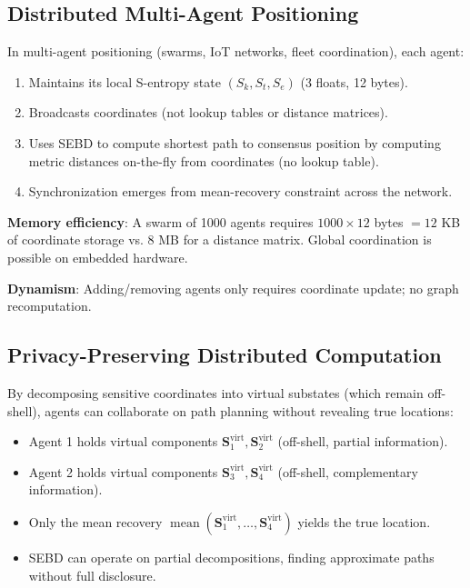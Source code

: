 \documentclass[twocolumn,11pt,a4paper]{article}
\newcommand{\Sk}{S_k}
\newcommand{\St}{S_t}
\newcommand{\Se}{S_e}
\newcommand{\Stuple}{\mathbf{S}}
\DeclareMathOperator{\mean}{mean}
\begin{document}
\subsection{Distributed Multi-Agent Positioning}

In multi-agent positioning (swarms, IoT networks, fleet coordination), each agent:
\begin{enumerate}[nosep]
  \item Maintains its local S-entropy state $(\Sk, \St, \Se)$ (3 floats, 12 bytes).
  \item Broadcasts coordinates (not lookup tables or distance matrices).
  \item Uses SEBD to compute shortest path to consensus position by computing metric distances on-the-fly from coordinates (no lookup table).
  \item Synchronization emerges from mean-recovery constraint across the network.
\end{enumerate}

\textbf{Memory efficiency}: A swarm of 1000 agents requires $1000 \times 12$ bytes $= 12$ KB of coordinate storage vs. 8 MB for a distance matrix. Global coordination is possible on embedded hardware.

\textbf{Dynamism}: Adding/removing agents only requires coordinate update; no graph recomputation.

\subsection{Privacy-Preserving Distributed Computation}

By decomposing sensitive coordinates into virtual substates (which remain off-shell), agents can collaborate on path planning without revealing true locations:
\begin{itemize}[nosep,leftmargin=1em]
  \item Agent 1 holds virtual components $\Stuple_1^{\text{virt}}, \Stuple_2^{\text{virt}}$ (off-shell, partial information).
  \item Agent 2 holds virtual components $\Stuple_3^{\text{virt}}, \Stuple_4^{\text{virt}}$ (off-shell, complementary information).
  \item Only the mean recovery $\mean(\Stuple_1^{\text{virt}}, \ldots, \Stuple_4^{\text{virt}})$ yields the true location.
  \item SEBD can operate on partial decompositions, finding approximate paths without full disclosure.
\end{itemize}
\end{document}
